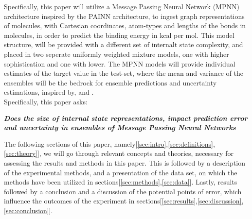 Specifically, this paper will utilize a Message Passing Neural Network (MPNN) architecture inspired by the
PAINN architecture\cite{PAINN}, to ingest graph representations of molecules, with Cartesian coordinates, atom-types and lengths
of the bonds in molecules, in order to predict the binding energy in kcal per mol. This model structure, will be provided with
a different set of internalt state complexity, and placed in two seperate uniformly weighted mixture models, one with higher sophistication
and one with lower.
The MPNN models will provide individual estimates of the target value in the test-set, where the mean and variance of the ensembles
will be the bedrock for ensemble predictions and uncertainty estimations, inspired by\cite{Lakshminarayanan2016}, and \cite{Tran2019}.\\


Specifically, this paper asks:

\begin{center}
  \textbf{\textit{Does the size of internal state representations, impact prediction error and uncertainty in ensembles of
      Message Passing Neural Networks}}
\end{center}


The following sections of this paper, namely[\ref{sec:intro},\ref{sec:definitions},\ref{sec:theory}],
we will go through relevant concepts and theories, necessary for assessing the results and methods in this paper.
This is followed by a description of the experimental methods, and a presentation of the data set,
on which the methods have been utilized in sections[\ref{sec:methods},\ref{sec:data}].
Lastly, results followed by a conclusion and a discussion of the potential points of error,
which influence the outcomes of the experiment in sections[\ref{sec:results},\ref{sec:discussion},\ref{sec:conclusion}].

\newpage


